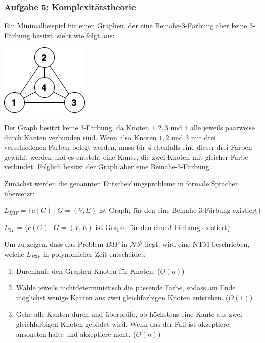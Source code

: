\newpage
\subsubsection{Aufgabe 5: Komplexitätstheorie}

\begin{teile}
 
	\item 
	Ein Minimalbeispiel für einen Graphen, der eine Beinahe-3-Färbung aber keine 3-Färbung besitzt, sieht wie folgt aus:

	\includegraphics[scale=0.6]{minimal_graph_beinahe-drei-faerbung}
	
	Der Graph besitzt keine 3-Färbung, da Knoten $1,2,3$ und $4$ alle jeweils paarweise durch Kanten verbunden sind. Wenn also Knoten $1,2$ und $3$ mit drei verschiedenen Farben belegt werden, muss für $4$ ebenfalls eine dieser drei Farben gewählt werden und es entsteht eine Kante, die zwei Knoten mit gleicher Farbe verbindet. Folglich besitzt der Graph aber eine Beinahe-3-Färbung.

	\item
	Zunächst werden die genannten Entscheidungsprobleme in formale Sprachen übersetzt:

	$L_{B3F} = \{c(G)\ |\ G=(V,E) \text{ ist Graph, für den eine Beinahe-3-Färbung existiert}\}$

	$L_{3F} = \{c(G)\ |\ G=(V,E) \text{ ist Graph, für den eine 3-Färbung existiert}\}$

	Um zu zeigen, dass das Problem $B3F$ in $\mathcal{NP}$ liegt, wird eine NTM beschrieben, welche $L_{B3F}$ in polynomieller Zeit entscheidet:
	\begin{enumerate}
		\item Durchlaufe den Graphen Knoten für Knoten. ($O(n)$)
		\item Wähle jeweils nichtdeterministisch die passende Farbe, sodass am Ende möglichst wenige Kanten aus zwei gleichfarbigen Knoten entstehen. ($O(1)$)
		\item Gehe alle Kanten durch und überprüfe, ob höchstens eine Kante aus zwei gleichfarbigen Knoten gebildet wird. Wenn das der Fall ist akzeptiere, ansonsten halte und akzeptiere nicht. ($O(n)$)
	\end{enumerate}


\end{teile}
